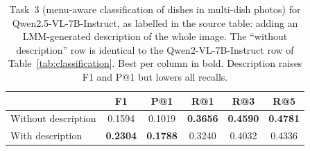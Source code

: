 \begin{table}[t]
  \centering
  \caption{Task~3 (menu-aware classification of dishes in multi-dish photos) for Qwen2.5-VL-7B-Instruct, as labelled in the source table: adding an LMM-generated description of the whole image. The ``without description'' row is identical to the Qwen2-VL-7B-Instruct row of Table~\ref{tab:classification}. Best per column in bold. Description raises F1 and P@1 but lowers all recalls.}
  \label{tab:desc_guided}
  \footnotesize
  \setlength{\tabcolsep}{2.5pt}
  \begin{tabular}{@{}lccccc@{}}
    \toprule
    & \textbf{F1} & \textbf{P@1} & \textbf{R@1} & \textbf{R@3} & \textbf{R@5} \\
    \midrule
    Without description & 0.1594 & 0.1019 & \textbf{0.3656} & \textbf{0.4590} & \textbf{0.4781} \\
    With description    & \textbf{0.2304} & \textbf{0.1788} & 0.3240 & 0.4032 & 0.4336 \\
    \bottomrule
  \end{tabular}
\end{table}
